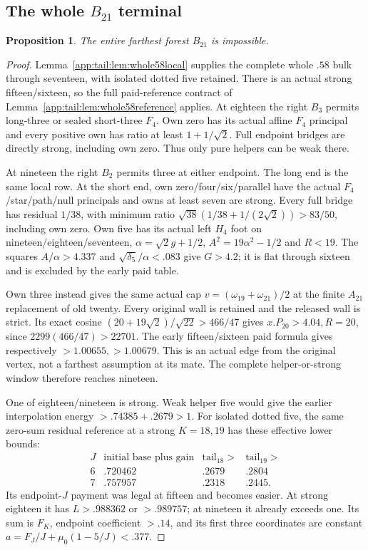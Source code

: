\documentclass[11pt]{article}
\newtheorem{proposition}[theorem]{Proposition}
\theoremstyle{definition}
\theoremstyle{remark}
\begin{document}
\subsection{The whole $B_{21}$ terminal}
\label{app:tail:wholeB21}
\begin{proposition}
\label{app:tail:prop:wholeB21}
The entire farthest forest $B_{21}$ is impossible.
\end{proposition}
\begin{proof}
Lemma~\ref{app:tail:lem:whole58local} supplies the complete whole
$.58$ bulk through seventeen, with isolated dotted five retained.
There is an actual strong fifteen/sixteen, so the full paid-reference
contract of Lemma~\ref{app:tail:lem:whole58reference} applies.
At eighteen the right $B_3$ permits long-three or sealed short-three
$F_4$. Own zero has its actual affine $F_4$ principal and every
positive own has ratio at least $1+1/\sqrt2$. Full endpoint bridges
are directly strong, including own zero. Thus only pure helpers
can be weak there.

At nineteen the right $B_2$ permits three at either endpoint.
The long end is the same local row. At the short end, own
zero/four/six/parallel have the actual $F_4$/star/path/null
principals and owns at least seven are strong. Every full bridge
has residual $1/38$, with minimum ratio
$\sqrt{38}(1/38+1/(2\sqrt2))>83/50$, including own zero.
Own five has its actual left $H_4$ foot on nineteen/eighteen/seventeen,
$\alpha=\sqrt2g+1/2$, $A^2=19\alpha^2-1/2$ and $R<19$.
The squares $A/\alpha>4.337$ and
$\sqrt{\delta_5}/\alpha<.083$ give $G>4.2$; it is flat
through sixteen and is excluded by the early paid table.

Own three instead gives the same actual cap
$v=(\omega_{19}+\omega_{21})/2$ at the finite $A_{21}$
replacement of old twenty. Every original wall is retained and
the released wall is strict. Its exact cosine
$(20+19\sqrt2)/\sqrt{22}>466/47$ gives
$x.P_{20}>4.04,R=20$, since $2299(466/47)>22701$.
The early fifteen/sixteen paid formula gives respectively
$>1.00655,>1.00679$. This is an actual edge from the original
vertex, not a farthest assumption at its mate. The complete
helper-or-strong window therefore reaches nineteen.

One of eighteen/nineteen is strong. Weak helper five would give
the earlier interpolation energy $>.74385+.2679>1$.
For isolated dotted five, the same zero-sum residual reference at
a strong $K=18,19$ has these effective lower bounds:
\[
\begin{array}{c|c|c|c}
J&\text{initial base plus gain}&\text{tail}_{18}>&\text{tail}_{19}>\\\hline
6&.720462&.2679&.2804\\7&.757957&.2318&.2445 .
\end{array}
\]
Its endpoint-$J$ payment was legal at fifteen and becomes easier.
At strong eighteen it has $L>.988362$ or $>.989757$;
at nineteen it already exceeds one. Its sum is $F_K$, endpoint
coefficient $> .14$, and its first three coordinates are constant
$a=F_J/J+\mu_0(1-5/J)<.377$.


\end{proof}
\end{document}

